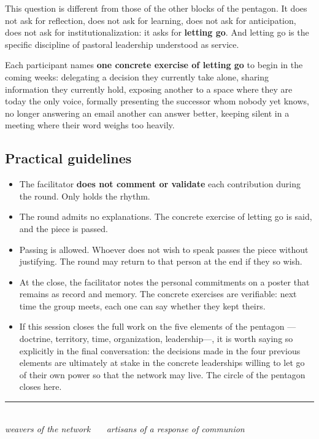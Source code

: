 \documentclass[11pt, a4paper]{article}
\begin{document}
\vspace{0.5em}

This question is different from those of the other blocks of the pentagon. It does not ask for reflection, does not ask for learning, does not ask for anticipation, does not ask for institutionalization: it asks for \textbf{letting go}. And letting go is the specific discipline of pastoral leadership understood as service.

Each participant names \textbf{one concrete exercise of letting go} to begin in the coming weeks: delegating a decision they currently take alone, sharing information they currently hold, exposing another to a space where they are today the only voice, formally presenting the successor whom nobody yet knows, no longer answering an email another can answer better, keeping silent in a meeting where their word weighs too heavily.

\subsection*{Practical guidelines}

\begin{itemize}
  \item The facilitator \textbf{does not comment or validate} each contribution during the round. Only holds the rhythm.
  \item The round admits no explanations. The concrete exercise of letting go is said, and the piece is passed.
  \item Passing is allowed. Whoever does not wish to speak passes the piece without justifying. The round may return to that person at the end if they so wish.
  \item At the close, the facilitator notes the personal commitments on a poster that remains as record and memory. The concrete exercises are verifiable: next time the group meets, each one can say whether they kept theirs.
  \item If this session closes the full work on the five elements of the pentagon ---doctrine, territory, time, organization, leadership---, it is worth saying so explicitly in the final conversation: the decisions made in the four previous elements are ultimately at stake in the concrete leaderships willing to let go of their own power so that the network may live. The circle of the pentagon closes here.
\end{itemize}

\vspace{2em}

\begin{center}
{\color{regla}\rule{0.35\linewidth}{0.5pt}}\\
\vspace{0.6em}
{\color{tenue}\itshape\small weavers of the network \ \textbullet\ \ artisans of a response of communion}
\end{center}
\end{document}

